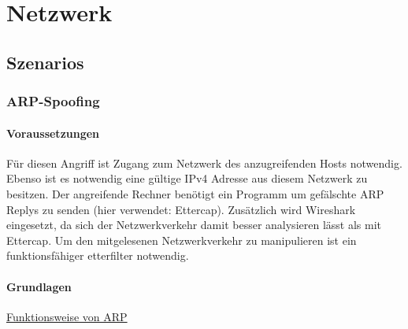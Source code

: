 
\chapter{Netzwerk}

\section{Szenarios}
\subsection{ARP-Spoofing}

\subsubsection*{Voraussetzungen}

Für diesen Angriff ist Zugang zum Netzwerk des anzugreifenden Hosts notwendig. Ebenso ist es notwendig eine gültige IPv4 Adresse aus diesem Netzwerk zu besitzen.
Der angreifende Rechner benötigt ein Programm um gefälschte ARP Replys zu senden (hier verwendet: Ettercap). Zusätzlich wird Wireshark eingesetzt, da sich der Netzwerkverkehr damit besser analysieren lässt als mit Ettercap.
Um den mitgelesenen Netzwerkverkehr zu manipulieren ist ein funktionsfähiger etterfilter notwendig.

\subsubsection*{Grundlagen}

\uline{Funktionsweise von ARP}

